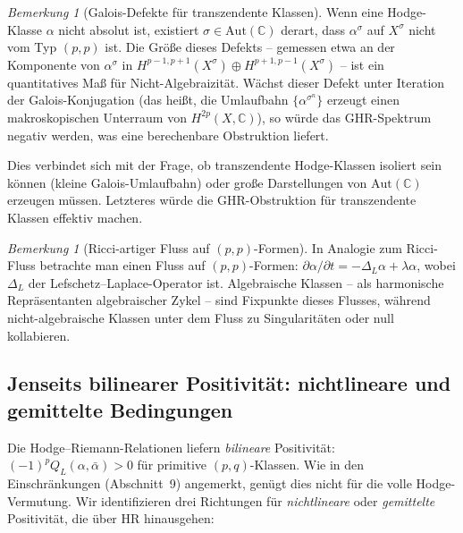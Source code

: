 \documentclass[aps,prd,twocolumn,superscriptaddress,nofootinbib]{revtex4-2}
\theoremstyle{definition}
\theoremstyle{remark}
\newtheorem{remark}[theorem]{Bemerkung}
\begin{document}
\begin{remark}[Galois-Defekte für transzendente Klassen]
\label{rem:galois-defects}
Wenn eine Hodge-Klasse $\alpha$ nicht absolut ist, existiert $\sigma \in \mathrm{Aut}(\mathbb{C})$ derart, dass $\alpha^\sigma$ auf $X^\sigma$ nicht vom Typ $(p,p)$ ist. Die \glqq Größe\grqq{} dieses Defekts -- gemessen etwa an der Komponente von $\alpha^\sigma$ in $H^{p-1,p+1}(X^\sigma) \oplus H^{p+1,p-1}(X^\sigma)$ -- ist ein quantitatives Maß für Nicht-Algebraizität. Wächst dieser Defekt unter Iteration der Galois-Konjugation (das heißt, die Umlaufbahn $\{\alpha^{\sigma^n}\}$ erzeugt einen \glqq makroskopischen\grqq{} Unterraum von $H^{2p}(X, \mathbb{C})$), so würde das GHR-Spektrum negativ werden, was eine berechenbare Obstruktion liefert.

Dies verbindet sich mit der Frage, ob transzendente Hodge-Klassen \glqq isoliert\grqq{} sein können (kleine Galois-Umlaufbahn) oder große Darstellungen von $\mathrm{Aut}(\mathbb{C})$ erzeugen müssen. Letzteres würde die GHR-Obstruktion für transzendente Klassen effektiv machen.
\end{remark}

\begin{remark}[Ricci-artiger Fluss auf $(p,p)$-Formen]
\label{rem:ricci-flow}
In Analogie zum Ricci-Fluss betrachte man einen Fluss auf $(p,p)$-Formen: $\partial \alpha / \partial t = -\Delta_L \alpha + \lambda \alpha$, wobei $\Delta_L$ der Lefschetz--Laplace-Operator ist. Algebraische Klassen -- als harmonische Repräsentanten algebraischer Zykel -- sind Fixpunkte dieses Flusses, während nicht-algebraische Klassen unter dem Fluss zu Singularitäten oder null kollabieren.
\end{remark}

\subsection{Jenseits bilinearer Positivität: nichtlineare und gemittelte Bedingungen}
\label{sec:nonlinear-positivity}

Die Hodge--Riemann-Relationen liefern \emph{bilineare} Positivität: $(-1)^p Q_L(\alpha, \bar\alpha) > 0$ für primitive $(p,q)$-Klassen. Wie in den Einschränkungen (Abschnitt~9) angemerkt, genügt dies nicht für die volle Hodge-Vermutung. Wir identifizieren drei Richtungen für \emph{nichtlineare} oder \emph{gemittelte} Positivität, die über HR hinausgehen:
\end{document}

